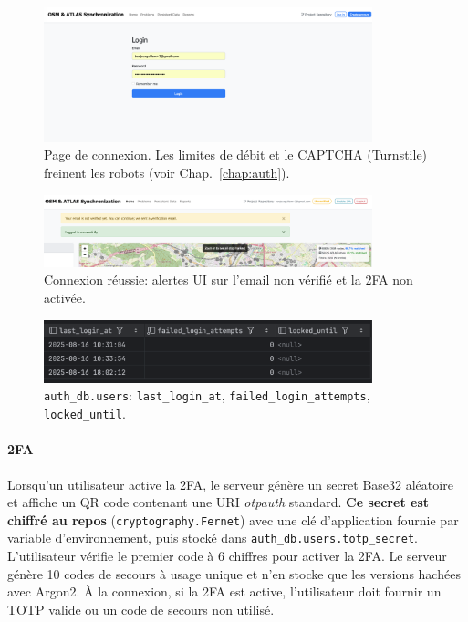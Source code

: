 \begin{figure}[H]
  \centering
  \includegraphics[width=0.85\textwidth]{../figures/chap10/login_page.png}
  \caption{Page de connexion. Les limites de débit et le CAPTCHA (Turnstile) freinent les robots (voir Chap.~\ref{chap:auth}).}
\end{figure}

\begin{figure}[H]
  \centering
  \includegraphics[width=0.85\textwidth]{../figures/chap10/login_succesful.png}
  \caption{Connexion réussie: alertes UI sur l'email non vérifié et la 2FA non activée.}
\end{figure}

\begin{figure}[H]
  \centering
  \includegraphics[width=0.85\textwidth]{../figures/chap10/auth_db4.png}
  \caption{\texttt{auth\_db.users}: \texttt{last\_login\_at}, \texttt{failed\_login\_attempts}, \texttt{locked\_until}.}
\end{figure}

\paragraph{2FA}
Lorsqu'un utilisateur active la 2FA, le serveur génère un secret Base32 aléatoire et affiche un QR code contenant une URI \textit{otpauth} standard. \textbf{Ce secret est chiffré au repos} (\texttt{cryptography.Fernet}) avec une clé d'application fournie par variable d'environnement, puis stocké dans \texttt{auth\_db.users.totp\_secret}. L'utilisateur vérifie le premier code à 6 chiffres pour activer la 2FA. Le serveur génère 10 codes de secours à usage unique et n'en stocke que les versions hachées avec Argon2. À la connexion, si la 2FA est active, l'utilisateur doit fournir un TOTP valide ou un code de secours non utilisé.

